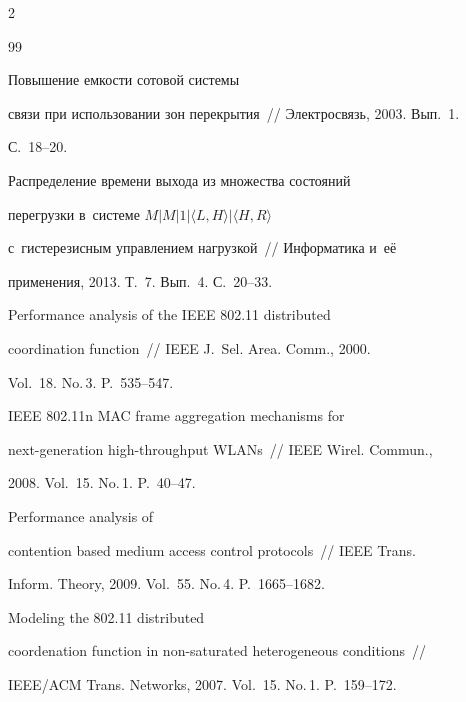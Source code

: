 \begin{multicols}{2}
{{\begin{thebibliography}{99}


 Повышение емкости сотовой системы 


связи при использовании зон перекрытия~// Электросвязь, 2003. Вып.~1. 


С.~18--20.




 Распределение времени выхода из множества состояний 


перегрузки в~системе $M|M|1|\langle L,H \rangle |\langle H,R \rangle$ 


с~гистерезисным управлением нагрузкой~// Информатика и~её 


применения, 2013. Т.~7. Вып.~4. С.~20--33.




 Performance analysis of the IEEE 802.11 distributed 


coordination function~// IEEE J.~Sel. Area. Comm., 2000. 


Vol.~18. No.\,3. P.~535--547.




 IEEE 802.11n MAC frame aggregation mechanisms for  


next-generation high-throughput WLANs~// IEEE Wirel. Commun., 


2008. Vol.~15. No.\,1. P.~40--47.







 Performance analysis of 


contention based medium access control protocols~// IEEE Trans. 


Inform. Theory, 2009. Vol.~55. No.\,4. P.~1665--1682.




 Modeling the 802.11 distributed 


coordenation function in non-saturated heterogeneous conditions~// 


IEEE/ACM Trans. Networks, 2007. Vol.~15. No.\,1. P.~159--172.



\end{thebibliography}}}
\end{multicols}
